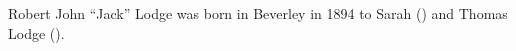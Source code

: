 
Robert John ``Jack'' Lodge was born in Beverley in 1894 to Sarah () and Thomas Lodge ().\cite{JackLodgeBirthCert}
